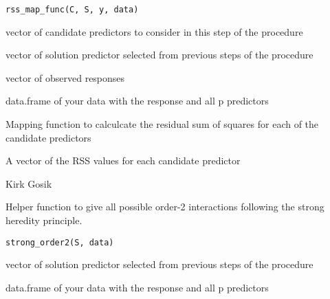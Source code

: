 \documentclass[letterpaper]{book}
\begin{document}
%
\begin{Usage}
\begin{verbatim}
rss_map_func(C, S, y, data)
\end{verbatim}
\end{Usage}
%
\begin{Arguments}
\begin{ldescription}
\item[\code{C}] vector of candidate predictors to consider in this step of the procedure

\item[\code{S}] vector of solution predictor selected from previous steps of the procedure

\item[\code{y}] vector of observed responses

\item[\code{data}] data.frame of your data with the response and all p predictors
\end{ldescription}
\end{Arguments}
%
\begin{Details}\relax
Mapping function to calculcate the residual sum of squares for each of the candidate predictors
\end{Details}
%
\begin{Value}
A vector of the RSS values for each candidate predictor
\end{Value}
%
\begin{Author}\relax
Kirk Gosik
\end{Author}
%
\begin{Description}\relax
Helper function to give all possible order-2 interactions following the strong
heredity principle.
\end{Description}
%
\begin{Usage}
\begin{verbatim}
strong_order2(S, data)
\end{verbatim}
\end{Usage}
%
\begin{Arguments}
\begin{ldescription}
\item[\code{S}] vector of solution predictor selected from previous steps of the procedure

\item[\code{data}] data.frame of your data with the response and all p predictors
\end{ldescription}
\end{Arguments}
\end{document}
